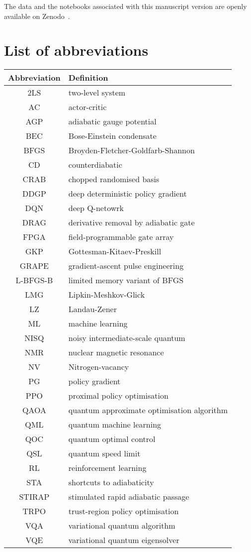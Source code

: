 The data and the notebooks associated with this manuscript version are openly available on Zenodo~\cite{zenodo_record}.

\newpage
\appendix*
\section*{List of abbreviations}
\begin{table}[!h]
\centering
\begin{tabular}{|c|p{7.5cm}|}
\hline
Abbreviation & Definition \\
\hline\hline
2LS & two-level system \\
\hline
AC & actor-critic \\
\hline
AGP & adiabatic gauge potential \\
\hline
BEC & Bose-Einstein condensate \\
\hline
BFGS & Broyden-Fletcher-Goldfarb-Shannon \\
\hline
CD & counterdiabatic \\
\hline
CRAB & chopped randomised basis \\
\hline
DDGP & deep deterministic policy gradient \\
\hline
DQN & deep Q-netowrk \\
\hline
DRAG & derivative removal by adiabatic gate \\
\hline
FPGA & field-programmable gate array \\
\hline
GKP & Gottesman-Kitaev-Preskill \\
\hline
GRAPE & gradient-ascent pulse engineering \\
\hline
L-BFGS-B & limited memory variant of BFGS \\
\hline
LMG & Lipkin-Meshkov-Glick \\
\hline
LZ & Landau-Zener \\
\hline
ML & machine learning \\
\hline
NISQ & noisy intermediate-scale quantum \\
\hline
NMR & nuclear magnetic resonance \\
\hline
NV & Nitrogen-vacancy \\
\hline
PG & policy gradient \\
\hline
PPO & proximal policy optimisation \\
\hline
QAOA & quantum approximate optimisation algorithm \\
\hline
QML & quantum machine learning \\
\hline
QOC & quantum optimal control \\
\hline
QSL & quantum speed limit \\
\hline
RL & reinforcement learning \\
\hline
STA & shortcuts to adiabaticity \\
\hline
STIRAP & stimulated rapid adiabatic passage \\
\hline
TRPO & trust-region policy optimisation \\
\hline
VQA & variational quantum algorithm \\
\hline
VQE & variational quantum eigensolver \\
\hline


\end{tabular}
\end{table}
